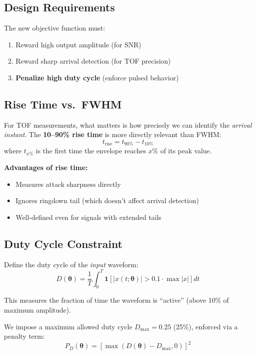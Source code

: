 \documentclass[11pt]{article}
\begin{document}
\subsection{Design Requirements}

The new objective function must:
\begin{enumerate}
    \item Reward high output amplitude (for SNR)
    \item Reward sharp arrival detection (for TOF precision)
    \item \textbf{Penalize high duty cycle} (enforce pulsed behavior)
\end{enumerate}

\subsection{Rise Time vs.\ FWHM}

For TOF measurements, what matters is how precisely we can identify the \textit{arrival instant}. The \textbf{10--90\% rise time} is more directly relevant than FWHM:
\begin{equation}
    t_{\text{rise}} = t_{90\%} - t_{10\%}
\end{equation}
where $t_{x\%}$ is the first time the envelope reaches $x\%$ of its peak value.

\textbf{Advantages of rise time:}
\begin{itemize}
    \item Measures attack sharpness directly
    \item Ignores ringdown tail (which doesn't affect arrival detection)
    \item Well-defined even for signals with extended tails
\end{itemize}

\subsection{Duty Cycle Constraint}

Define the duty cycle of the \textit{input} waveform:
\begin{equation}
    D(\boldsymbol{\theta}) = \frac{1}{T} \int_0^T \mathbf{1}\left[ |x(t; \boldsymbol{\theta})| > 0.1 \cdot \max|x| \right] dt
\end{equation}

This measures the fraction of time the waveform is ``active'' (above 10\% of maximum amplitude).

We impose a maximum allowed duty cycle $D_{\max} = 0.25$ (25\%), enforced via a penalty term:
\begin{equation}
    P_D(\boldsymbol{\theta}) = \left[ \max\left( D(\boldsymbol{\theta}) - D_{\max}, 0 \right) \right]^2
\end{equation}
\end{document}
